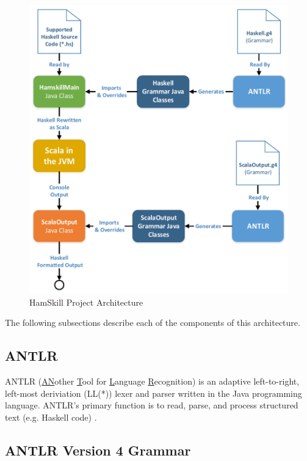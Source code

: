 \documentclass{report}
\begin{document}
\begin{figure}[ht!]
	\centering
		\includegraphics[width=1.0\textwidth]{images/cs252_project_diagram_cropped.pdf}
	\caption{HamSkill Project Architecture}
\end{figure}\label{fig:hamskillArchitecture}

The following subsections describe each of the components of this architecture.

\subsection{ANTLR}

ANTLR (\underline{AN}other \underline{T}ool for \underline{L}anguage \underline{R}ecognition) is an adaptive left-to-right, left-most deriviation (LL(*)) lexer and parser written in the Java programming language.  ANTLR's primary function is to read, parse, and process structured text (e.g. Haskell code) \cite{antlrDefinitiveReference}.  

\subsection{ANTLR Version 4 Grammar}
\end{document}
